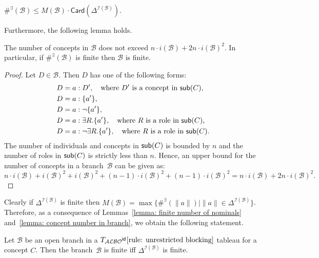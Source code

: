 \documentclass[leqno
,pdflatex
,prodmode
,acmtocl
]{acmsmall}
\newcommand{\mathcmd}[1]{\ensuremath{#1}\xspace}
\newcommand{\dlfont}{\mathcal}
\newcommand{\dl}[1]{\mathcmd{\dlfont{#1}}}
\newcommand{\idRole}{\mathcmd{\textsf{\upshape\mdseries id}}}
\newcommand{\ALBOid}{\dl{ALBO\smash[t]{\mbox{${}^{\idRole}$}}}}
\def\Not{\neg}
\newcommand{\sub}{\mathcmd{\textsf{\upshape sub}}}
\newcommand{\metasmbfont}{\mathsf}
\newcommand{\Card}{\mathcmd{\metasmbfont{Card}}}
\newcommand{\branch}[1]{\seg{#1}}
\newcommand{\seg}[1]{\mathcmd{\mathcal{#1}}}
\newcommand{\indiv}{a}
\newcommand{\I}{\mathcal{I}}
\newcommand{\TALBOidub}{\mathcmd{T_\ALBOid\eqref{rule: unrestricted blocking}}}
\newcommand{\napplE}{\#^\exists}
\newcommand{\IB}{{\I(\branch{B})}}
\begin{document}
\begin{lemma}\label{lemma: finite number of nominals}
$\napplE(\branch{B})\leq M(\branch{B})\cdot\Card(\Delta^\IB)$.
\end{lemma}
Furthermore, the following lemma holds.
\begin{lemma}\label{lemma: concept number in branch}
The number of concepts in $\branch{B}$ does not exceed $n\cdot i(\branch{B})+2n\cdot i(\branch{B})^2$.
In particular, if $\napplE(\branch{B})$ is finite then $\branch{B}$ is finite.
\end{lemma}
\begin{proof}
Let $D\in\branch{B}$. Then $D$
has one of the following forms:
\begin{align*}
D&=\indiv:D',\quad \text{where $D'$ is a concept in $\sub(C)$,}\\
D&=\indiv:\{\indiv'\},\\
D&=\indiv:\Not\{\indiv'\},\\
D&=\indiv:\exists R.\{\indiv'\},\quad \text{where $R$ is a role in $\sub(C)$,}\\
D&=\indiv:\Not\exists R.\{\indiv'\},\quad \text{where $R$ is a role in $\sub(C)$.}
\end{align*}
The number of individuals and concepts in $\sub(C)$ is bounded by $n$
and the number of roles in $\sub(C)$ is strictly less than $n$.
Hence, an upper bound for the number of concepts in a branch~$\branch{B}$
can be given as:
$n\cdot i(\branch{B}) + i(\branch{B}) ^2+
 i(\branch{B}) ^2+(n-1)\cdot i(\branch{B}) ^2+(n-1)\cdot i(\branch{B}) ^2
= n\cdot i(\branch{B}) +2n\cdot i(\branch{B}) ^2.$
\end{proof}
Clearly if $\Delta^\IB$ is finite then 
$M(\branch{B})=\max\{\napplE(\|\indiv\|)\mid\|\indiv\|\in\Delta^\IB\}$.
Therefore, as a consequence of Lemmas~\ref{lemma: finite number of nominals} and~\ref{lemma: concept number in branch},
we obtain the following statement.
\begin{corollary}\label{corollary: branch finiteness criterion}
Let $\branch{B}$ be an open branch in a $\TALBOidub$ tableau for a concept $C$.
Then the branch~$\branch{B}$ is finite iff $\Delta^\IB$ is finite.
\end{corollary}
\end{document}

